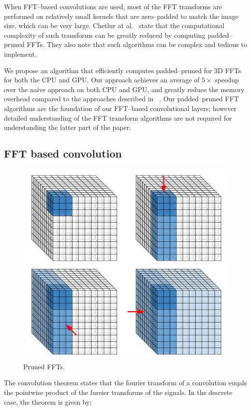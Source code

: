 \documentclass[conference]{IEEEtran}
\begin{document}
  When FFT--based convolutions are used, most of the FFT transforms
  are performed on relatively small kernels that are zero--padded to
  match the image size, which can be very large.  Chetlur at
  al.~\cite{chetlur2014cudnn} state that the computational complexity
  of such transforms can be greatly reduced by computing
  padded--pruned FFTs.  They also note that such algorithms can be
  complex and tedious to implement.

  We propose an algorithm that efficiently computes padded--pruned for
  3D FFTs for both the CPU and GPU. Our approach achieves an average
  of $5 \times$ speedup over the naive approach on both CPU and GPU,
  and greatly reduce the memory overhead compared to the approaches
  described in ~\cite{mathieu-iclr-14,vasilache2014fast}.  Our
  padded--pruned FFT algorithms are the foundation of our FFT--based
  convolutional layers; however detailed understanding of the FFT
  transform algorithms are not required for understanding the latter
  part of the paper.

\subsection{FFT based convolution}

  \begin{figure}
    \begin{center}
      \includegraphics[width=0.55\columnwidth]{fig/pruned_ffts.pdf}
    \end{center}
    \caption{Pruned FFTs.}
    \label{fig:pruned_ffts}
  \end{figure}

  The convolution theorem states that the fourier transform of a
  convolution euqals the pointwise product of the fureier transforms
  of the signals.  In the descrete case, the theorem is given by:
\end{document}
